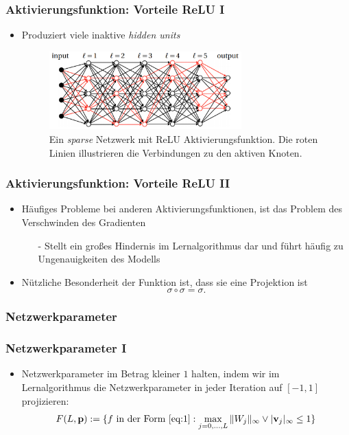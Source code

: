 \documentclass[hyperref={pdfpagelabels=false}]{beamer}
\begin{document}
\begin{frame}
\frametitle{Aktivierungsfunktion: Vorteile ReLU \RN{1}}
\begin{itemize}
\item Produziert viele inaktive \textit{hidden units} \bigskip
\begin{figure}[h]
  \centering
  \includegraphics[width=0.7\textwidth]{Bilder/ReLUSparsity.png}
  \caption[Caption for LOF]{Ein \textit{sparse} Netzwerk mit ReLU Aktivierungsfunktion. Die roten Linien illustrieren die Verbindungen zu den aktiven Knoten.}
\end{figure}
\end{itemize}
\end{frame}

\begin{frame}
\frametitle{Aktivierungsfunktion: Vorteile ReLU \RN{2}}
\begin{itemize}
\item Häufiges Probleme bei anderen Aktivierungsfunktionen, ist das Problem des Verschwinden des Gradienten 
\begin{itemize}
\item[-] Stellt ein großes Hindernis im Lernalgorithmus dar und führt häufig zu Ungenauigkeiten des Modells
\end{itemize}
\item Nützliche Besonderheit der Funktion ist, dass sie eine Projektion ist
\begin{equation*} 
\sigma \circ \sigma = \sigma.
\end{equation*}
\end{itemize}
\end{frame}

\subsubsection{Netzwerkparameter}
\begin{frame}
\frametitle{Netzwerkparameter \RN{1}}
\begin{itemize}
\item Netzwerkparameter im Betrag kleiner $1$ halten, indem wir im Lernalgorithmus die Netzwerkparameter in jeder Iteration auf $[-1,1]$ projizieren: 
\begin{equation*}
F(L,\mathbf{p}) := \{f  \text{ in der Form \eqref{eq:1}}: \max\limits_{j = 0, ... ,L} \Vert W_j \Vert _{\infty}  \vee \vert \mathbf{v}_j \vert _{\infty} \leq 1 \}
\end{equation*}
\end{itemize}
\end{frame}
\end{document}

